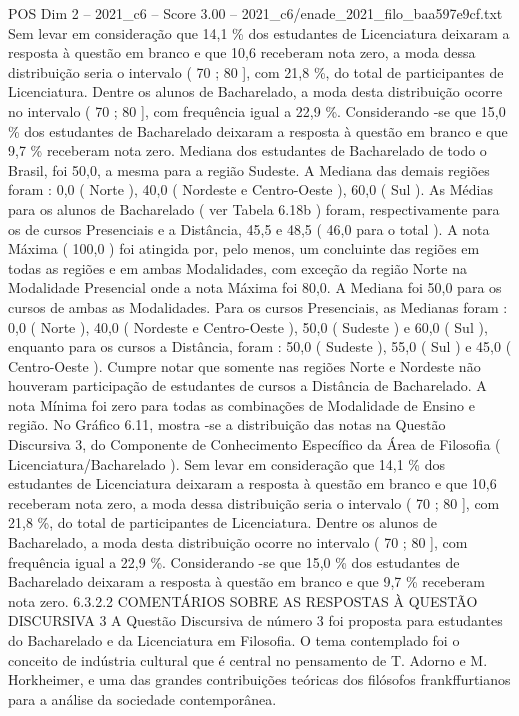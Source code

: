 \begin{textsample}{POS Dim 2 – 2021\_c6 – Score 3.00 – 2021\_c6/enade\_2021\_filo\_baa597e9cf.txt}
Sem levar em consideração que 14,1 \% dos estudantes de Licenciatura deixaram a resposta à questão em branco e que 10,6 receberam nota zero, a moda dessa distribuição seria o intervalo ( 70 ; 80 ], com 21,8 \%, do total de participantes de Licenciatura.
Dentre os alunos de Bacharelado, a moda desta distribuição ocorre no intervalo ( 70 ; 80 ], com frequência igual a 22,9 \%.
Considerando -se que 15,0 \% dos estudantes de Bacharelado deixaram a resposta à questão em branco e que 9,7 \% receberam nota zero.
Mediana dos estudantes de Bacharelado de todo o Brasil, foi 50,0, a mesma para a região Sudeste.
A Mediana das demais regiões foram : 0,0 ( Norte ), 40,0 ( Nordeste e Centro-Oeste ), 60,0 ( Sul ).
As Médias para os alunos de Bacharelado ( ver Tabela 6.18b ) foram, respectivamente para os de cursos Presenciais e a Distância, 45,5 e 48,5 ( 46,0 para o total ).
A nota Máxima ( 100,0 ) foi atingida por, pelo menos, um concluinte das regiões em todas as regiões e em ambas Modalidades, com exceção da região Norte na Modalidade Presencial onde a nota Máxima foi 80,0.
A Mediana foi 50,0 para os cursos de ambas as Modalidades.
Para os cursos Presenciais, as Medianas foram : 0,0 ( Norte ), 40,0 ( Nordeste e Centro-Oeste ), 50,0 ( Sudeste ) e 60,0 ( Sul ), enquanto para os cursos a Distância, foram : 50,0 ( Sudeste ), 55,0 ( Sul ) e 45,0 ( Centro-Oeste ).
Cumpre notar que somente nas regiões Norte e Nordeste não houveram participação de estudantes de cursos a Distância de Bacharelado.
A nota Mínima foi zero para todas as combinações de Modalidade de Ensino e região.
No Gráfico 6.11, mostra -se a distribuição das notas na Questão Discursiva 3, do Componente de Conhecimento Específico da Área de Filosofia ( Licenciatura/Bacharelado ).
Sem levar em consideração que 14,1 \% dos estudantes de Licenciatura deixaram a resposta à questão em branco e que 10,6 receberam nota zero, a moda dessa distribuição seria o intervalo ( 70 ; 80 ], com 21,8 \%, do total de participantes de Licenciatura.
Dentre os alunos de Bacharelado, a moda desta distribuição ocorre no intervalo ( 70 ; 80 ], com frequência igual a 22,9 \%.
Considerando -se que 15,0 \% dos estudantes de Bacharelado deixaram a resposta à questão em branco e que 9,7 \% receberam nota zero. 6.3.2.2 COMENTÁRIOS SOBRE AS RESPOSTAS À QUESTÃO DISCURSIVA 3 A Questão Discursiva de número 3 foi proposta para estudantes do Bacharelado e da Licenciatura em Filosofia.
O tema contemplado foi o conceito de indústria cultural que é central no pensamento de T.
Adorno e M.
Horkheimer, e uma das grandes contribuições teóricas dos filósofos frankffurtianos para a análise da sociedade contemporânea.

\end{textsample}
